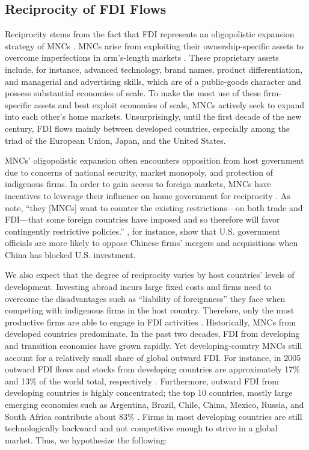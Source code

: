 \documentclass{article}
\begin{document}
\subsection{Reciprocity of FDI Flows}
Reciprocity stems from the fact that FDI represents an oligopolistic expansion strategy of MNCs \citep{Hymer:1976,Kindleberger:1969}. MNCs arise from exploiting their ownership-specific assets to overcome imperfections in arm's-length markets \citep{Caves:1996,Dunning:1992}. These proprietary assets include, for instance, advanced technology, brand names, product differentiation, and managerial and advertising skills, which are of a public-goods character and possess substantial economies of scale. To make the most use of these firm-specific assets and best exploit economies of scale, MNCs actively seek to expand into each other's home markets. Unsurprisingly, until the first decade of the new century, FDI flows mainly between developed countries, especially among the triad of the European Union, Japan, and the United States.

MNCs' oligopolistic expansion often encounters opposition from host government due to concerns of national security, market monopoly, and protection of indigenous firms. In order to gain access to foreign markets, MNCs have incentives to leverage their influence on home government for reciprocity \citep{Milner:1988,Crystal:2003}. As \citet[6]{Crystal:2003} note, ``they [MNCs] want to counter the existing restrictions---on both trade and FDI---that some foreign countries have imposed and so therefore will favor contingently restrictive policies.'' \citet{Tingley:2015}, for instance, show that U.S. government officials are more likely to oppose Chinese firms' mergers and acquisitions when China has blocked U.S. investment.

We also expect that the degree of reciprocity varies by host countries' levels of development. Investing abroad incurs large fixed costs and firms need to overcome the disadvantages such as ``liability of foreignness'' they face when competing with indigenous firms in the host country. Therefore, only the most productive firms are able to engage in FDI activities \citep{Melitz:2003,Helpman_et_al:2004}. Historically, MNCs from developed countries predominate. In the past two decades, FDI from developing and transition economies have grown rapidly. Yet developing-country MNCs still account for a relatively small share of global outward FDI. For instance, in 2005 outward FDI flows and stocks from developing countries are approximately 17\% and 13\% of the world total, respectively \citep{UNCTAD:2006}. Furthermore, outward FDI from developing countries is highly concentrated; the top 10 countries, mostly large emerging economies such as Argentina, Brazil, Chile, China, Mexico, Russia, and South Africa contribute about 83\% \citep{UNCTAD:2006}. Firms in most developing countries are still technologically backward and not competitive enough to strive in a global market. Thus, we hypothesize the following:
\end{document}

